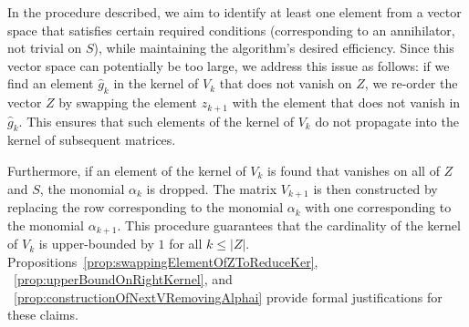 \documentclass[11pt]{llncs}
\begin{document}


In the procedure described, we aim to identify at least one element from a vector space that satisfies certain required conditions (corresponding to an annihilator, not trivial on $S$), while maintaining the algorithm's desired efficiency. 
Since this vector space can potentially be too large, we address this issue as follows: if we find an element \( \hat{g}_k \) in the kernel of \( V_k \) that does not vanish on \( Z \), we re-order the vector \( Z \) by swapping the element \( z_{k+1} \) with the element that does not vanish in \( \hat{g}_k \). 
This ensures that such elements of the kernel of \( V_k \) do not propagate into the kernel of subsequent matrices.

Furthermore, if an element of the kernel of \( V_k \) is found that vanishes on all of \( Z \) and \( S \), the monomial \( \alpha_k \) is dropped. 
The matrix \( V_{k+1} \) is then constructed by replacing the row corresponding to the monomial \( \alpha_k \) with one corresponding to the monomial \( \alpha_{k+1} \).
This procedure guarantees that the cardinality of the kernel of \( V_k \) is upper-bounded by \( 1 \) for all \( k \leq |Z| \).
Propositions~\ref{prop:swappingElementOfZToReduceKer}, ~\ref{prop:upperBoundOnRightKernel}, and ~\ref{prop:constructionOfNextVRemovingAlphai} provide formal justifications for these claims.
\end{document}
